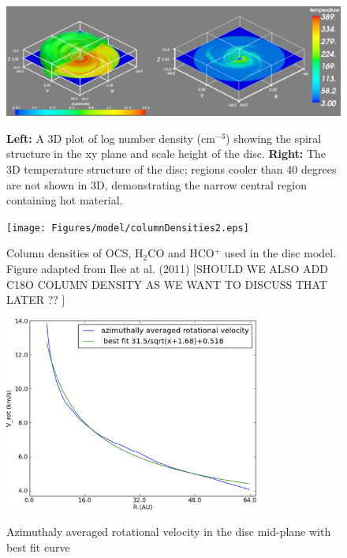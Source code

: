 \documentclass[useAMS,usenatbib]{mn2e}
\begin{document}
\begin{figure}
 \includegraphics[width=168mm]{Figures/model/rhoT2.eps}
 \label{rhoT} 
 \caption{{\bf Left:} A 3D plot of log number density (cm$^{-3}$) showing the spiral structure in the xy plane and scale height of the disc. {\bf Right:} The 3D temperature structure of the disc; regions cooler than 40 degrees are not shown in 3D, demonstrating the narrow central region containing hot material.}
\end{figure}

\begin{figure}
 \texttt{[image: Figures/model/columnDensities2.eps]}
 \label{Chemistry} 
 \caption{Column densities of OCS, H$_2$CO and HCO$^+$ used in the disc model. Figure adapted from Ilee at al. (2011) [SHOULD WE ALSO ADD C18O COLUMN DENSITY AS WE WANT TO DISCUSS THAT LATER ?? ]}
\end{figure}

\begin{figure}
 \includegraphics[width=84mm]{Figures/model/rotational_velocities.eps}
 \label{velocity}
 \caption{Azimuthaly averaged rotational velocity in the disc mid-plane with best fit curve}
\end{figure}
\end{document}
